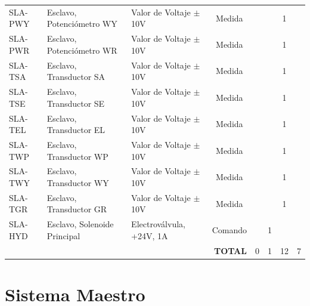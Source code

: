 \begin{table}
\begin{tabular}{lllccccc}
    SLA-PWY & Esclavo, Potenciómetro WY & Valor de Voltaje $\pm$10V & Medida &       &       & 1     &  \\
    SLA-PWR & Esclavo, Potenciómetro WR & Valor de Voltaje $\pm$10V & Medida &       &       & 1     &  \\
    SLA-TSA & Esclavo, Transductor SA & Valor de Voltaje $\pm$10V & Medida &       &       & 1     &  \\
    SLA-TSE & Esclavo, Transductor SE & Valor de Voltaje $\pm$10V & Medida &       &       & 1     &  \\
    SLA-TEL & Esclavo, Transductor EL & Valor de Voltaje $\pm$10V & Medida &       &       & 1     &  \\
    SLA-TWP & Esclavo, Transductor WP & Valor de Voltaje $\pm$10V & Medida &       &       & 1     &  \\
    SLA-TWY & Esclavo, Transductor WY & Valor de Voltaje $\pm$10V & Medida &       &       & 1     &  \\
    SLA-TGR & Esclavo, Transductor GR & Valor de Voltaje $\pm$10V & Medida &       &       & 1     &  \\
    SLA-HYD & Esclavo, Solenoide Principal & Electroválvula, +24V, 1A & Comando &       & 1     &       &  \\
    \midrule
    \multicolumn{4}{r}{\textbf{TOTAL}} & 0 & 1 & 12 & 7 \\
    \bottomrule
    \end{tabular}%
  \label{tab:signalsSlave}%
\end{table}%








































\newpage
\section{Sistema Maestro}

